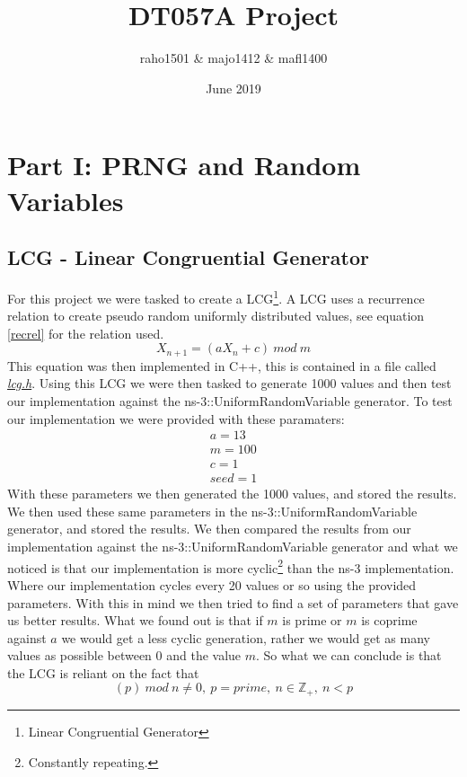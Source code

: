 \documentclass{article}
\title{DT057A Project}
\author{raho1501 \& majo1412 \& mafl1400}
\date{June 2019}
\begin{document}
\maketitle

\section{Part I: PRNG and Random Variables} \label{part1}
  \subsection{LCG - Linear Congruential Generator}
    For this project we were tasked to create a LCG\footnote{Linear Congruential Generator}. 
    A LCG uses a recurrence relation to create pseudo random uniformly distributed values, see equation \ref{recrel} for the relation used.
    \begin{equation} \label{recrel}
      X_{n+1} = (aX_{n} + c)\ mod\ m
    \end{equation}
    This equation was then implemented in C++, this is contained in a file called \href{https://github.com/NoRines/simulerings_projekt/blob/master/lcg.h}{\emph{lcg.h}}.
    Using this LCG we were then tasked to generate 1000 values and then test our implementation against the ns-3::UniformRandomVariable generator. 
    To test our implementation we were provided with these paramaters:
    \begin{align*}
      a=13 \\
      m=100 \\
      c=1 \\
      seed=1
    \end{align*}
    With these parameters we then generated the 1000 values, and stored the results.
    We then used these same parameters in the ns-3::UniformRandomVariable generator, and stored the results.
    We then compared the results from our implementation against the ns-3::UniformRandomVariable generator and what we noticed is that our implementation is more cyclic\footnote{Constantly repeating.} than the ns-3 implementation. 
    Where our implementation cycles every 20 values or so using the provided parameters.
    With this in mind we then tried to find a set of parameters that gave us better results.
    What we found out is that if $m$ is prime or $m$ is coprime against $a$ we would get a less cyclic generation, rather we would get as many values as possible between 0 and the value $m$.
    So what we can conclude is that the LCG is reliant on the fact that
    \begin{equation}
      (p)\ mod\ n \neq 0,\ p = prime,\ n \in \mathbb{Z}_{+} ,\ n < p
    \end{equation}
\end{document}
